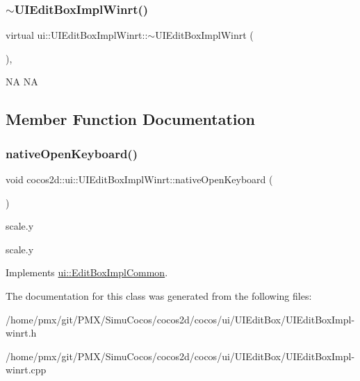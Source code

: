 \subsubsection{\texorpdfstring{$\sim$\+U\+I\+Edit\+Box\+Impl\+Winrt()}{~UIEditBoxImplWinrt()}\hspace{0.1cm}{\footnotesize\ttfamily [2/2]}}
{\footnotesize\ttfamily virtual ui\+::\+U\+I\+Edit\+Box\+Impl\+Winrt\+::$\sim$\+U\+I\+Edit\+Box\+Impl\+Winrt (\begin{DoxyParamCaption}{ }\end{DoxyParamCaption})\hspace{0.3cm}{\ttfamily [inline]}, {\ttfamily [virtual]}}

NA  NA 

\subsection{Member Function Documentation}
\mbox{\label{classui_1_1UIEditBoxImplWinrt_a68387234c978d3f8d466ad351bafb059}} 
\subsubsection{\texorpdfstring{native\+Open\+Keyboard()}{nativeOpenKeyboard()}}
{\footnotesize\ttfamily void cocos2d\+::ui\+::\+U\+I\+Edit\+Box\+Impl\+Winrt\+::native\+Open\+Keyboard (\begin{DoxyParamCaption}{ }\end{DoxyParamCaption})\hspace{0.3cm}{\ttfamily [virtual]}}

scale.\+y

scale.\+y 

Implements \hyperlink{classui_1_1EditBoxImplCommon}{ui\+::\+Edit\+Box\+Impl\+Common}.



The documentation for this class was generated from the following files\+:\begin{DoxyCompactItemize}
\item 
/home/pmx/git/\+P\+M\+X/\+Simu\+Cocos/cocos2d/cocos/ui/\+U\+I\+Edit\+Box/U\+I\+Edit\+Box\+Impl-\/winrt.\+h\item 
/home/pmx/git/\+P\+M\+X/\+Simu\+Cocos/cocos2d/cocos/ui/\+U\+I\+Edit\+Box/U\+I\+Edit\+Box\+Impl-\/winrt.\+cpp\end{DoxyCompactItemize}
